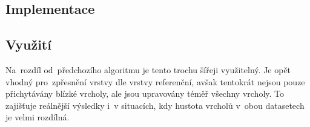
\subsection{Implementace}
\label{ca-implementace}

\subsection{Využití}
\label{ca-vyuziti}

Na~rozdíl od~předchozího algoritmu je tento trochu šířeji využitelný. Je opět 
vhodný pro~zpřesnění vrstvy dle vrstvy referenční, avšak tentokrát nejsou 
pouze přichytávány blízké vrcholy, ale jsou upravovány téměř všechny vrcholy. 
To zajišťuje reálnější výsledky i~v situacích, kdy hustota vrcholů v~obou 
datasetech je velmi rozdílná.

